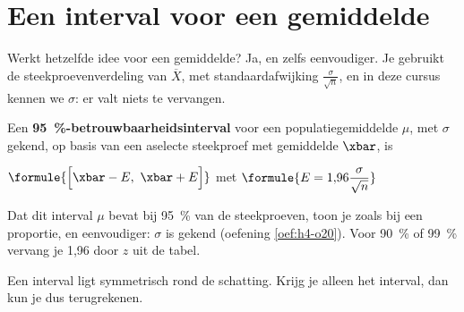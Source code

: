 \begin{oefeningen}
\end{oefeningen}

\section{Een interval voor een gemiddelde}

Werkt hetzelfde idee voor een gemiddelde? Ja, en zelfs eenvoudiger. Je gebruikt de steekproevenverdeling van $\overline{X}$, met standaardafwijking $\frac{\sigma}{\sqrt n}$, en in deze cursus kennen we $\sigma$: er valt niets te vervangen.

\begin{theorie}
Een \textbf{\textcolor{accent}{95~\%-betrouwbaarheidsinterval}} voor een populatiegemiddelde $\mu$, met $\sigma$ gekend, op basis van een aselecte steekproef met gemiddelde $\xbar$, is

\vspace{1mm}
\qquad $\formule{\Bigl[\xbar - E,\ \xbar + E\Bigr]}$ \quad met \quad $\formule{E = 1{,}96 \dfrac{\sigma}{\sqrt{n}}}$
\end{theorie}

Dat dit interval $\mu$ bevat bij 95~\% van de steekproeven, toon je zoals bij een proportie, en eenvoudiger: $\sigma$ is gekend (oefening \ref{oef:h4-o20}). Voor 90~\% of 99~\% vervang je 1,96 door $z$ uit de tabel.


\begin{oefeningen}
\end{oefeningen}

Een interval ligt symmetrisch rond de schatting. Krijg je alleen het interval, dan kun je dus terugrekenen.

